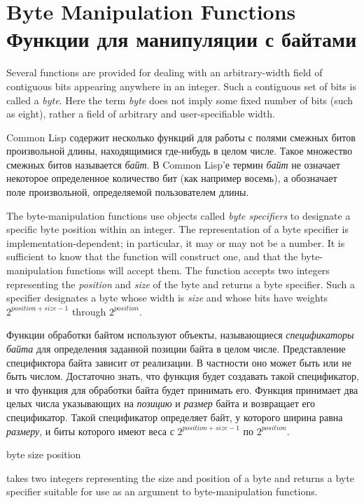 \section{Byte Manipulation Functions Функции для манипуляции с байтами}

Several functions are provided for dealing with an arbitrary-width field of
contiguous bits appearing anywhere in an integer.
Such a contiguous set of bits is called a \emph{byte}.
Here the term \emph{byte} does not imply some fixed number of bits
(such as eight), rather a field of arbitrary and user-specifiable width.

Common Lisp содержит несколько функций для работы с полями смежных битов
произвольной длины, находящимися где-нибудь в целом числе.
Такое множество смежных битов называется \emph{байт}.
В Common Lisp'е термин \emph{байт} не означает некоторое определенное количество
бит (как например восемь), а обозначает поле произвольной, определяемой
пользователем длины.

The byte-manipulation functions use objects called \emph{byte specifiers} to
designate a specific byte position within an integer.
The representation of a byte specifier is implementation-dependent;
in particular, it may or may not be a number.
It is sufficient to know that the function  will construct one,
and that the byte-manipulation functions will accept them.
The function  accepts two integers representing
the \emph{position} and \emph{size} of the byte and returns
a byte specifier.
Such a specifier designates a byte whose width is \emph{size}
and whose bits have weights $ 2^{position+size-1} $
through $ 2^{position} $.

Функции обработки байтом используют объекты, называющиеся \emph{спецификаторы
  байта} для определения заданной позиции байта в целом числе.
Представление спецификтора байта зависит от реализации. В частности оно может
быть или не быть числом.
Достаточно знать, что функция  будет создавать такой спецификатор, и
что функция для обработки байта будет принимать его.
Функция  принимает два целых числа указывающих на \emph{позицию} и
\emph{размер} байта и возвращает его спецификатор.
Такой спецификатор определяет байт, у которого ширина равна \emph{размеру}, и
биты которого имеют веса с $ 2^{position+size-1} $
по $ 2^{position} $.

\begin{defun}[Function]
byte size position

 takes two integers representing the size and position
of a byte and returns a byte specifier suitable for use
as an argument to byte-manipulation functions.
\end{defun}

